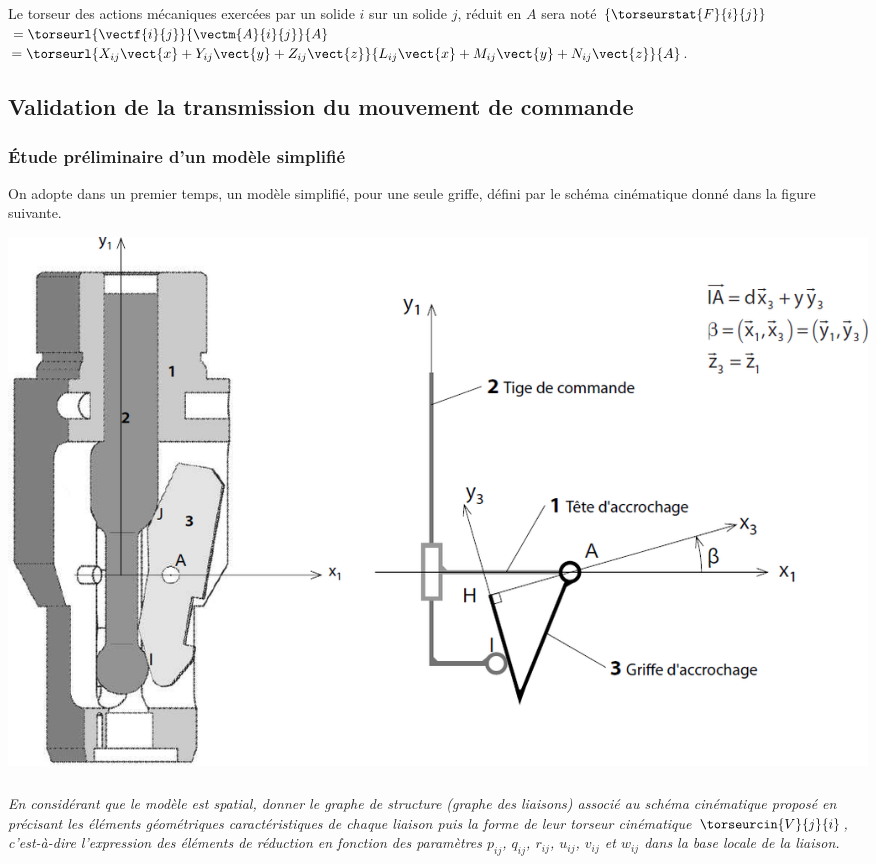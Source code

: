 \documentclass[10pt,fleqn]{article} %
\begin{document}
\begin{multicols}{2}
Le torseur des actions mécaniques exercées par un solide $i$ sur un solide $j$, réduit en $A$ sera noté $\left\{ \torseurstat{F}{i}{j}\right\}$ $=\torseurl{\vectf{i}{j}}{\vectm{A}{i}{j}}{A}$ $=\torseurl{X_{ij}\vect{x}+Y_{ij}\vect{y}+Z_{ij}\vect{z}}{L_{ij} \vect{x}+M_{ij}\vect{y}+N_{ij}\vect{z}}{A}$.%

\subsection*{Validation de la transmission du mouvement de commande} 
\subsubsection*{Étude préliminaire d'un modèle simplifié}
On adopte dans un premier temps, un modèle simplifié, pour une seule griffe, défini par le schéma cinématique
donné dans la figure suivante.


\begin{center}
\includegraphics[width=\linewidth]{images/fig_01}
\end{center}


\subparagraph{}\textit{En considérant que le modèle est spatial, donner le graphe de structure (graphe des liaisons) associé au schéma cinématique proposé en précisant les éléments géométriques caractéristiques de chaque liaison puis
la forme de leur torseur cinématique $\torseurcin{V}{j}{i}$, c'est-à-dire l'expression des éléments de réduction en fonction des paramètres $p_{ij}$, $q_{ij}$, $r_{ij}$, $u_{ij}$, $v_{ij}$ et $w_{ij}$ dans la base locale de la liaison.}
\ifprof
\begin{corrige}~\\
\end{corrige}
\else
\fi


\end{multicols}
\end{document}
